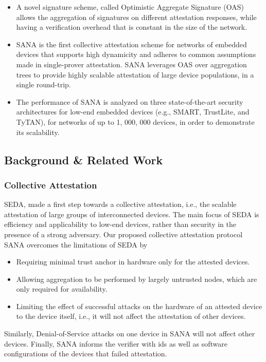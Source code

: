 \documentclass{article}
\begin{document}
\begin{itemize}
\item A novel signature scheme, called Optimistic Aggregate Signature (OAS) allows the aggregation of signatures on different attestation responses, while having a verification overhead that is constant in the size of the network.
\item SANA is the first collective attestation scheme for networks of embedded devices that supports high dynamicity and adheres to common assumptions made in single-prover attestation. SANA leverages OAS over aggregation trees to provide highly scalable attestation of large device populations, in a single round-trip.
\item The performance of SANA is analyzed on three state-of-the-art security architectures for low-end embedded devices (e.g., SMART, TrustLite, and TyTAN), for networks of up to 1, 000, 000 devices, in order to demonstrate its scalability.
\end{itemize}

\subsection{Background \& Related Work}

\subsubsection{Collective Attestation}

SEDA, made a first step towards a collective attestation, i.e., the scalable attestation of large groups of interconnected devices. The main focus of SEDA is efficiency and applicability to low-end devices, rather than security in the presence of a strong adversary. Our proposed collective attestation protocol SANA overcomes the limitations of SEDA by \begin{itemize}
\item Requiring minimal trust anchor in hardware only for the attested devices.
\item Allowing aggregation to be performed by largely untrusted nodes, which are only required for availability.
\item Limiting the effect of successful attacks on the hardware of an attested device to the device itself, i.e., it will not affect the attestation of other devices.
\end{itemize} 
Similarly, Denial-of-Service attacks on one device in SANA will not affect other devices. Finally, SANA informs the verifier with ids as well as software configurations of the devices that failed attestation.
\end{document}
